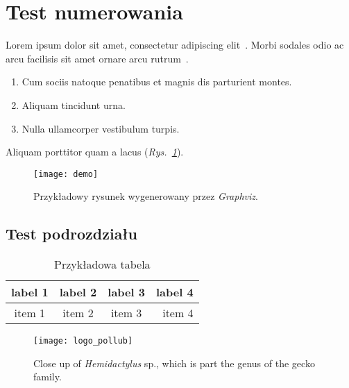 \section{Test numerowania}

Lorem ipsum dolor sit amet, consectetur adipiscing elit~\cite{test1}. Morbi sodales odio ac arcu facilisis sit amet ornare arcu rutrum~\cite{test1,test2}.

\begin{enumerate}
  \item{Cum sociis natoque penatibus et magnis dis parturient montes.}
  \item{Aliquam tincidunt urna.}
  \item{Nulla ullamcorper vestibulum turpis.}
\end{enumerate}

\lipsum[2]

\przyklad \lipsum[12] 

\noindent Aliquam porttitor quam a lacus (\emph{Rys.~\ref{fig:gfx-demo-1}}).


\begin{figure}[h!tb]
  \centering
  \texttt{[image: demo]}
  \caption[Przykładowy rysunek]%
  {Przykładowy rysunek wygenerowany przez \emph{Graphviz}.}
  \label{fig:gfx-demo-1}
\end{figure}

\subsection{Test podrozdziału}

\lipsum[3]

\begin{table}[h!tb]
  \center
  \caption{Przykładowa tabela}
  \label{my_table}
  \begin{tabular}{ | c | c | c | r | }
    \hline
  label 1 & label 2 & label 3 & label 4 \\
  \hline
  item 1  & item 2  & item 3  & item 4  \\
  \hline
  \end{tabular}
\end{table}

\lipsum[4]

\begin{figure}[h!tb]
  \centering
  \texttt{[image: logo\_pollub]}
  \caption[Close up of \textit{Hemidactylus} sp.]%
  {Close up of \textit{Hemidactylus} sp., which is
  part the genus of the gecko family.}
\end{figure}

